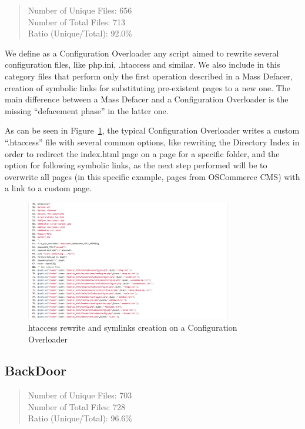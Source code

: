 \begin{quote}
Number of Unique Files: 656\\
Number of Total Files: 713\\
Ratio (Unique/Total): 92.0\%
\end{quote}

We define as a Configuration Overloader any script aimed to rewrite several configuration files, like php.ini, .htaccess and similar. We also include in this category files that perform only the first operation described in a Mass Defacer, creation of symbolic links for substituting pre-existent pages to a new one. The main difference between a Mass Defacer and a Configuration Overloader is the missing ``defacement phase'' in the latter one.

As can be seen in Figure~\ref{fig:configOverload}, the typical Configuration Overloader writes a custom ``.htaccess'' file with several common options, like rewriting the Directory Index in order to redirect the index.html page on a page for a specific folder, and the option for following symbolic links, as the next step performed will be to overwrite all pages (in this specific example, pages from OSCommerce CMS) with a link to a custom page.

\begin{figure}[H]
\centerline{\includegraphics[width=0.8\textwidth]{Images/configOverload.jpg}}
\caption{htaccess rewrite and symlinks creation on a Configuration Overloader\label{fig:configOverload}}
\end{figure}

\subsection{BackDoor}

\begin{quote}
Number of Unique Files: 703\\
Number of Total Files: 728\\
Ratio (Unique/Total): 96.6\%
\end{quote}

